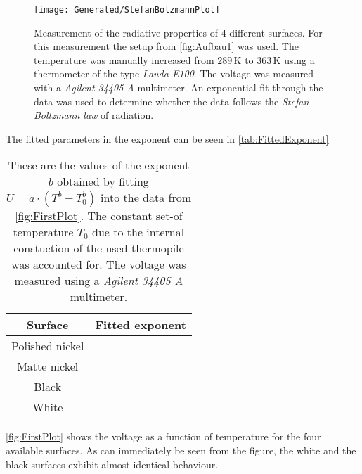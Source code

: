 \documentclass[a4paper,10pt,twocolumn]{article}
\begin{document}
    \begin{figure}
               \begin{center}
               \texttt{[image: Generated/StefanBolzmannPlot]}
               \caption{Measurement of the radiative properties of 4 different surfaces.
               For this measurement the setup from \autoref{fig:Aufbau1} was used. The temperature was manually increased from $ 289\,$K to $363\,$K using a thermometer of the type \textit{Lauda E100}.
               The voltage was measured with a \textit{Agilent 34405 A} multimeter.
               An exponential fit through the data was used to determine whether the data follows the \textit{Stefan Boltzmann law} of radiation.}
               \label{fig:FirstPlot}
               \end{center}
    \end{figure}
    The fitted parameters in the exponent can be seen in \autoref{tab:FittedExponent}
    \begin{table}[htbp]          %
        \centering
        \begin{tabular*}{0.9\linewidth}{@{\extracolsep{\fill}}cc}
            \hline
            \hline
            \rule[-7pt]{0pt}{23pt}  Surface  &  Fitted exponent 	 \\
            \hline
            \rule[-5pt]{0pt}{23pt}   Polished nickel   &   \ExponentPolished  	 \\
            \rule[-5pt]{0pt}{23pt}   Matte nickel   & \ExponentMatt     	 \\
            \rule[-5pt]{0pt}{23pt}   Black  &   \ExponentBlack  	 \\
            \rule[-5pt]{0pt}{23pt}   White   &   \ExponentWhite  	 \\
            \hline
            \hline
        \end{tabular*}
        \normalsize
        \caption[]{These are the values of the exponent $b$ obtained by fitting $U = a\cdot(T^b - T_0^b) $ into the data from \autoref{fig:FirstPlot}.
        The constant set-of temperature $T_0$ due to the internal constuction of the used thermopile was accounted for.
        The voltage was measured using a \textit{Agilent 34405 A} multimeter.}  %
        \label{tab:FittedExponent}                             %
    \end{table}
    \autoref{fig:FirstPlot} shows the voltage as a function of temperature for the four available surfaces.
    As can immediately be seen from the figure, the white and the black surfaces exhibit almost identical behaviour.
\end{document}
